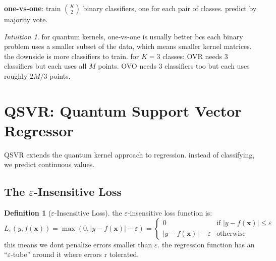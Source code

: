 \documentclass[11pt,a4paper]{article}
\theoremstyle{definition}
\newtheorem{definition}{Definition}[section]
\theoremstyle{remark}
\newtheorem*{intuition}{Intuition}
\begin{document}
\textbf{one-vs-one}: train $\binom{K}{2}$ binary classifiers, one for each pair of classes. predict by majority vote.

\begin{intuition}
for quantum kernels, one-vs-one is usually better bcs each binary problem uses a smaller subset of the data, which means smaller kernel matrices. the downside is more classifiers to train. for $K = 3$ classes: OVR needs 3 classifiers but each uses all $M$ points. OVO needs 3 classifiers too but each uses roughly $2M/3$ points.
\end{intuition}

\section{QSVR: Quantum Support Vector Regressor}

QSVR extends the quantum kernel approach to regression. instead of classifying, we predict continuous values.

\subsection{The $\varepsilon$-Insensitive Loss}

\begin{definition}[$\varepsilon$-Insensitive Loss]
the $\varepsilon$-insensitive loss function is:
\[
L_\varepsilon(y, f(\mathbf{x})) = \max(0, |y - f(\mathbf{x})| - \varepsilon) = \begin{cases} 0 & \text{if } |y - f(\mathbf{x})| \leq \varepsilon \\ |y - f(\mathbf{x})| - \varepsilon & \text{otherwise} \end{cases}
\]
this means we dont penalize errors smaller than $\varepsilon$. the regression function has an ``$\varepsilon$-tube'' around it where errors r tolerated.
\end{definition}
\end{document}
